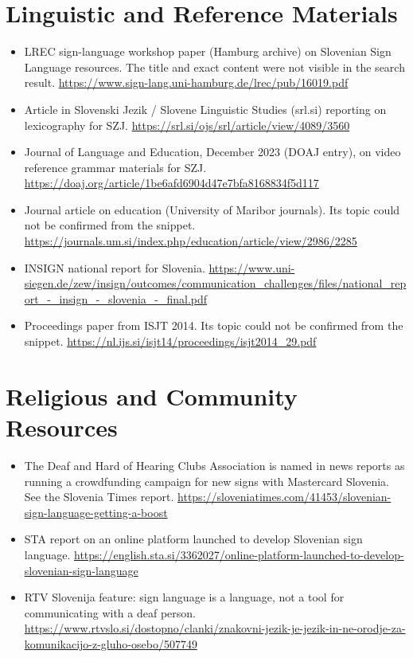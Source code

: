 \documentclass[12pt]{article}
\begin{document}
\section{Linguistic and Reference Materials}
\begin{itemize}
\item LREC sign-language workshop paper (Hamburg archive) on Slovenian Sign Language resources. The title and exact content were not visible in the search result. \url{https://www.sign-lang.uni-hamburg.de/lrec/pub/16019.pdf}
\item Article in Slovenski Jezik / Slovene Linguistic Studies (srl.si) reporting on lexicography for SZJ. \url{https://srl.si/ojs/srl/article/view/4089/3560}
\item Journal of Language and Education, December 2023 (DOAJ entry), on video reference grammar materials for SZJ. \url{https://doaj.org/article/1be6afd6904d47e7bfa8168834f5d117}
\item Journal article on education (University of Maribor journals). Its topic could not be confirmed from the snippet. \url{https://journals.um.si/index.php/education/article/view/2986/2285}
\item INSIGN national report for Slovenia. \url{https://www.uni-siegen.de/zew/insign/outcomes/communication_challenges/files/national_report_-_insign_-_slovenia_-_final.pdf}
\item Proceedings paper from ISJT 2014. Its topic could not be confirmed from the snippet. \url{https://nl.ijs.si/isjt14/proceedings/isjt2014_29.pdf}
\end{itemize}

\section{Religious and Community Resources}
\begin{itemize}
\item The Deaf and Hard of Hearing Clubs Association is named in news reports as running a crowdfunding campaign for new signs with Mastercard Slovenia. See the Slovenia Times report. \url{https://sloveniatimes.com/41453/slovenian-sign-language-getting-a-boost}
\item STA report on an online platform launched to develop Slovenian sign language. \url{https://english.sta.si/3362027/online-platform-launched-to-develop-slovenian-sign-language}
\item RTV Slovenija feature: sign language is a language, not a tool for communicating with a deaf person. \url{https://www.rtvslo.si/dostopno/clanki/znakovni-jezik-je-jezik-in-ne-orodje-za-komunikacijo-z-gluho-osebo/507749}
\end{itemize}
\end{document}
